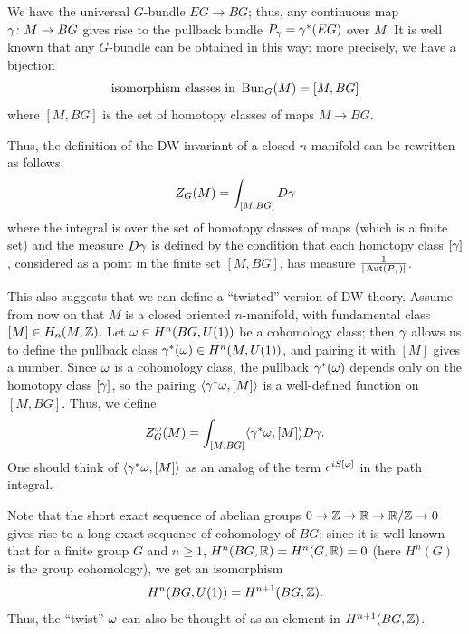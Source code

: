 We have the universal $G$-bundle $EG\to BG$; thus, any continuous map
$\gamma\colon M\to BG$ gives rise to the pullback bundle
$P_\gamma = \gamma^*(EG)$ over $M$. It is well known that any $G$-bundle can be
obtained in this way; more precisely, we have a bijection
$$
\text{isomorphism classes in }\operatorname{Bun}_G(M)= [M, BG]
$$
where $[M,BG]$ is the set of homotopy classes of
maps $M\to BG$.

Thus, the definition of the DW invariant of a closed $n$-manifold can
be rewritten as follows:
$$
  Z_G(M)=\int_{[M, BG]} D\gamma
$$
where the integral is over the set of homotopy classes of maps (which is a
finite set) and the measure $D\gamma$ is defined by the condition that each
homotopy class $[\gamma]$, considered as a point in the finite set $[M, BG]$, has
measure $\frac{1}{|\operatorname{Aut}(P_\gamma)|}$.

This also suggests that we can define a ``twisted'' version of DW theory.
Assume from now on that $M$ is a closed oriented $n$-manifold, with
fundamental class $[M]\in H_n(M, \mathbb{Z})$. Let
$\omega\in H^n(BG, U(1))$ be a cohomology class; then $\gamma$ allows us to
define the pullback class $\gamma^*(\omega)\in H^n(M, U(1))$, and pairing it with
$[M]$ gives a number. Since $\omega$ is a cohomology class, the pullback
$\gamma^*(\omega)$ depends only on the homotopy class $[\gamma]$, so the pairing
$\langle\gamma^* \omega, [M]\rangle$ is a well-defined function on $[M, BG]$. Thus, we define
\begin{equation}\label{e:DW-integral}
  Z_G^\omega (M)= \int_{[M, BG]}\langle\gamma^* \omega, [M]\rangle D\gamma.
\end{equation}
One should think of $\langle\gamma^* \omega, [M]\rangle$ as an analog of the term
$e^{iS[\varphi]}$ in the path integral.

Note that the short exact sequence of abelian groups $0\to \mathbb{Z}\to \mathbb{R} \to \mathbb{R}/\mathbb{Z}\to
0$ gives rise to a long exact sequence of cohomology of $BG$; since it is well
known that for a finite group $G$ and $n\ge 1$, $H^n(BG, \mathbb{R})=H^n(G,\mathbb{R})=0$ (here
$H^n(G)$ is the group cohomology), we get an isomorphism
$$
  H^n(BG, U(1))=H^{n+1}(BG, \mathbb{Z}).
$$
Thus, the ``twist'' $\omega$ can also be thought of as an element
in $H^{n+1}(BG,\mathbb{Z})$.

\clearpage
